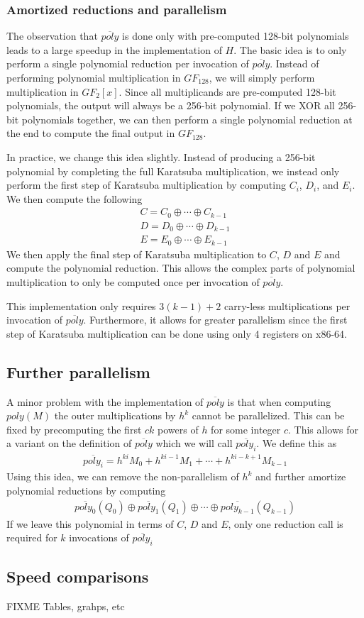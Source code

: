 \documentclass[hctr.tex]{subfiles}
\begin{document}
\subsubsection{Amortized reductions and parallelism}
The observation that $\overline{poly}$ is done only with pre-computed 128-bit polynomials leads to a large speedup in the implementation of $H$. The basic idea is to only perform a single polynomial reduction per invocation of $\overline{poly}$. Instead of performing polynomial multiplication in $GF_{128}$, we will simply perform multiplication in $GF_{2}[x]$. Since all multiplicands are pre-computed 128-bit polynomials, the output will always be a 256-bit polynomial. If we XOR all 256-bit polynomials together, we can then perform a single polynomial reduction at the end to compute the final output in $GF_{128}$.

In practice, we change this idea slightly. Instead of producing a 256-bit polynomial by completing the full Karatsuba multiplication, we instead only perform the first step of Karatsuba multiplication by computing $C_i$, $D_i$, and $E_i$. We then compute the following
\begin{gather*}
       C = C_0 \oplus \cdots \oplus C_{k-1}\\
       D = D_0 \oplus \cdots \oplus D_{k-1}\\
       E = E_0 \oplus \cdots \oplus E_{k-1}
\end{gather*}
We then apply the final step of Karatsuba multiplication to $C$, $D$ and $E$ and compute the polynomial reduction. This allows the complex parts of polynomial multiplication to only be computed once per invocation of $\overline{poly}$.

This implementation only requires $3(k-1) + 2$ carry-less multiplications per invocation of $\overline{poly}$. Furthermore, it allows for greater parallelism since the first step of Karatsuba multiplication can be done using only 4 registers on x86-64.

\subsection{Further parallelism}
A minor problem with the implementation of $\overline{poly}$ is that when computing $poly(M)$ the outer multiplications by $h^{k}$ cannot be parallelized. This can be fixed by precomputing the first $ck$ powers of $h$ for some integer $c$. This allows for a variant on the definition of $\overline{poly}$ which we will call $\overline{poly_i}$. We define this as
\begin{align*}
       \overline{poly_i} = h^{ki}M_0 + h^{ki-1}M_1 + \cdots + h^{ki - k + 1}M_{k-1}
\end{align*}
Using this idea, we can remove the non-parallelism of $h^k$ and further amortize polynomial reductions by computing
\begin{align*}
	\overline{poly_0}(Q_0) \oplus \overline{poly_1}(Q_1) \oplus \cdots \oplus \overline{poly_{k-1}}(Q_{k-1})
\end{align*}
If we leave this polynomial in terms of $C$, $D$ and $E$, only one reduction call is required for $k$ invocations of $\overline{poly_i}$

\subsection{Speed comparisons}
{\color{red} FIXME Tables, grahps, etc}

\printbibliography[heading=bibintoc]
\end{document}
